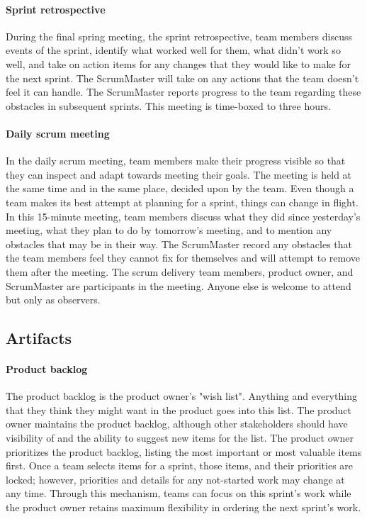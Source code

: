\paragraph{Sprint retrospective}
During the final spring meeting, the sprint retrospective, team members discuss events of the sprint, identify what worked well for them, what didn't work so well, and take on action items for any changes that they would like to make for the next sprint.
The ScrumMaster will take on any actions that the team doesn't feel it can handle.
The ScrumMaster reports progress to the team regarding these obstacles in subsequent sprints.
This meeting is time-boxed to three hours.

\paragraph{Daily scrum meeting}
In the daily scrum meeting, team members make their progress visible so that they can inspect and adapt towards meeting their goals.
The meeting is held at the same time and in the same place, decided upon by the team.
Even though a team makes its best attempt at planning for a sprint, things can change in flight.
In this 15-minute meeting, team members discuss what they did since yesterday's meeting, what they plan to do by tomorrow's meeting, and to mention any obstacles that may be in their way.
The ScrumMaster record any obstacles that the team members feel they cannot fix for themselves and will attempt to remove them after the meeting.
The scrum delivery team members, product owner, and ScrumMaster are participants in the meeting. Anyone else is welcome to attend but only as observers.

\subsection{Artifacts}
\paragraph{Product backlog}
The product backlog is the product owner's "wish list".
Anything and everything that they think they might want in the product goes into this list.
The product owner maintains the product backlog, although other stakeholders should have visibility of and the ability to suggest new items for the list.
The product owner prioritizes the product backlog, listing the most important or most valuable items first. Once a team selects items for a sprint, those items, and their priorities are locked; however, priorities and details for any not-started work may change at any time. Through this mechanism, teams can focus on this sprint's work while the product owner retains maximum flexibility in ordering the next sprint's work.

